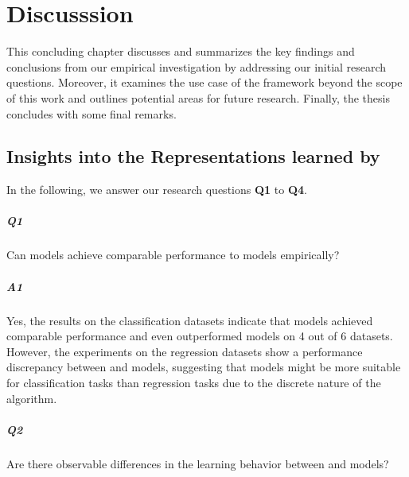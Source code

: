\cleardoubleoddstandardpage
\chapter{Discusssion}\label{sec:discussion}
This concluding chapter discusses and summarizes the key findings and conclusions from our empirical investigation by addressing our initial research questions. Moreover, it examines the use case of the \wlnn framework beyond the scope of this work and outlines potential areas for future research. Finally, the thesis concludes with some final remarks.

\section{Insights into the Representations learned by \gnns}
In the following, we answer our research questions \textbf {Q1} to \textbf{Q4}.

\paragraph{Q1} Can \wlnn models achieve comparable performance to \gnn models empirically?

\vspace{-15pt}

\paragraph{A1} Yes, the results on the classification datasets indicate that \wlnn models achieved comparable performance and even outperformed \gnn models on 4 out of 6 datasets. However, the experiments on the regression datasets show a performance discrepancy between \gnn and \wlnn models, suggesting that \wlnn models might be more suitable for classification tasks than regression tasks due to the discrete nature of the \wl algorithm.

\paragraph{Q2} Are there observable differences in the learning behavior between \wlnn and \gnn models?

\vspace{-15pt}

